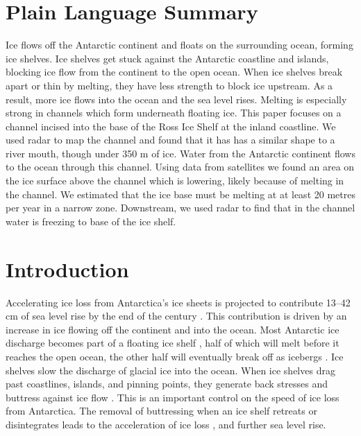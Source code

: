 \section{Plain Language Summary}
Ice flows off the Antarctic continent and floats on the surrounding ocean, forming ice shelves. Ice shelves get stuck against the Antarctic coastline and islands, blocking ice flow from the continent to the open ocean. When ice shelves break apart or thin by melting, they have less strength to block ice upstream. As a result, more ice flows into the ocean and the sea level rises. Melting is especially strong in channels which form underneath floating ice. This paper focuses on a channel incised into the base of the Ross Ice Shelf at the inland coastline. We used radar to map the channel and found that it has has a similar shape to a river mouth, though under 350 m of ice. Water from the Antarctic continent flows to the ocean through this channel. Using data from satellites we found an area on the ice surface above the channel which is lowering, likely because of melting in the channel. We estimated that the ice base must be melting at at least 20 metres per year in a narrow zone. Downstream, we used radar to find that in the channel water is freezing to base of the ice shelf. 


\section{Introduction}



Accelerating ice loss from Antarctica's ice sheets is projected to contribute 13--42 cm of sea level rise by the end of the century \citep{edwards2021projected}.
This contribution is driven by an increase in ice flowing off the continent and into the ocean. Most Antarctic ice discharge becomes part of a floating ice shelf \citep{rignot2013ice}, half of which will melt before it reaches the open ocean, the other half will eventually break off as icebergs \citep{rignot2013ice,liu2015ocean}. 
Ice shelves slow the discharge of glacial ice into the ocean. When ice shelves drag past coastlines, islands, and pinning points, they generate back stresses and buttress against ice flow \cite [e.g.][] {dupont2005assessment, furst2016safety}.  This is an important control on the speed of ice loss from Antarctica.  The removal of buttressing when an ice shelf retreats or disintegrates leads to the acceleration of ice loss \citep{rignot2004accelerated, berthier2012mass}, and further sea level rise.

